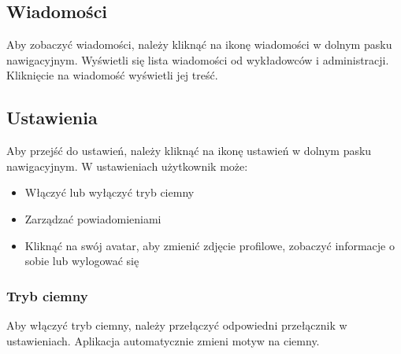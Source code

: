 \subsection{Wiadomości}

Aby zobaczyć wiadomości, należy kliknąć na ikonę wiadomości w dolnym pasku nawigacyjnym. Wyświetli się lista wiadomości od wykładowców i administracji. Kliknięcie na wiadomość wyświetli jej treść.


\subsection{Ustawienia}

Aby przejść do ustawień, należy kliknąć na ikonę ustawień w dolnym pasku nawigacyjnym. W ustawieniach użytkownik może:

\begin{itemize}
  \item Włączyć lub wyłączyć tryb ciemny
  \item Zarządzać powiadomieniami
  \item Kliknąć na swój avatar, aby zmienić zdjęcie profilowe, zobaczyć informacje o sobie lub wylogować się
\end{itemize}


\subsubsection{Tryb ciemny}

Aby włączyć tryb ciemny, należy przełączyć odpowiedni przełącznik w ustawieniach. Aplikacja automatycznie zmieni motyw na ciemny.


